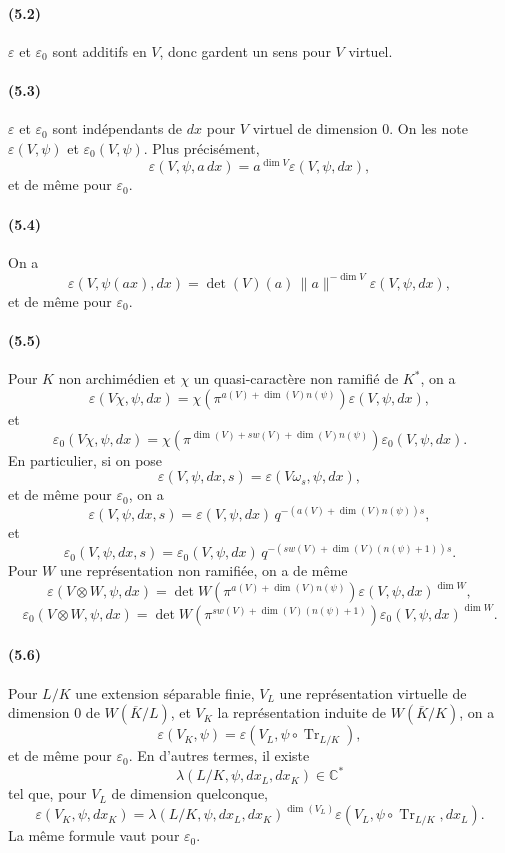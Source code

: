 \documentclass[10pt]{article}
\newcommand{\C}{\mathbb C}
\newcommand{\Tr}{\operatorname{Tr}}
\providecommand{\Tr}{\operatorname{Tr}}
\providecommand{\Tr}{\operatorname{Tr}}
\providecommand{\Tr}{\operatorname{Tr}}
\begin{document}
\paragraph{(5.2)} \(\varepsilon\) et \(\varepsilon_0\) sont additifs en \(V\), donc gardent un sens pour \(V\) virtuel.

\paragraph{(5.3)} \(\varepsilon\) et \(\varepsilon_0\) sont indépendants de \(dx\) pour \(V\) virtuel de dimension \(0\). On les note \(\varepsilon(V,\psi)\) et \(\varepsilon_0(V,\psi)\). Plus précisément,
\[
\varepsilon(V,\psi,a\,dx)=a^{\dim V}\varepsilon(V,\psi,dx),
\]
et de même pour \(\varepsilon_0\).

\paragraph{(5.4)} On a
\[
\varepsilon(V,\psi(ax),dx)
=
\det(V)(a)\,\|a\|^{-\dim V}\varepsilon(V,\psi,dx),
\]
et de même pour \(\varepsilon_0\).

\paragraph{(5.5)} Pour \(K\) non archimédien et \(\chi\) un quasi-caractère non ramifié de \(K^*\), on a
\[
\tag{5.5.1}
\varepsilon(V\chi,\psi,dx)
=
\chi\!\left(\pi^{a(V)+\dim(V)n(\psi)}\right)\varepsilon(V,\psi,dx),
\]
et
\[
\varepsilon_0(V\chi,\psi,dx)
=
\chi\!\left(\pi^{\dim(V)+sw(V)+\dim(V)n(\psi)}\right)
\varepsilon_0(V,\psi,dx).
\]
En particulier, si on pose
\[
\varepsilon(V,\psi,dx,s)=\varepsilon(V\omega_s,\psi,dx),
\]
et de même pour \(\varepsilon_0\), on a
\[
\tag{5.5.2}
\varepsilon(V,\psi,dx,s)
=
\varepsilon(V,\psi,dx)\,
q^{-(a(V)+\dim(V)n(\psi))s},
\]
et
\[
\varepsilon_0(V,\psi,dx,s)
=
\varepsilon_0(V,\psi,dx)\,
q^{-(sw(V)+\dim(V)(n(\psi)+1))s}.
\]
Pour \(W\) une représentation non ramifiée, on a de même
\[
\tag{5.5.3}
\varepsilon(V\otimes W,\psi,dx)
=
\det W\!\left(\pi^{a(V)+\dim(V)n(\psi)}\right)
\varepsilon(V,\psi,dx)^{\dim W},
\]
\[
\varepsilon_0(V\otimes W,\psi,dx)
=
\det W\!\left(\pi^{sw(V)+\dim(V)(n(\psi)+1)}\right)
\varepsilon_0(V,\psi,dx)^{\dim W}.
\]

\paragraph{(5.6)} Pour \(L/K\) une extension séparable finie, \(V_L\) une représentation virtuelle de dimension \(0\) de \(W(\overline K/L)\), et \(V_K\) la représentation induite de \(W(\overline K/K)\), on a
\[
\tag{5.6.1}
\varepsilon(V_K,\psi)=\varepsilon(V_L,\psi\circ\Tr_{L/K}),
\]
et de même pour \(\varepsilon_0\). En d'autres termes, il existe
\[
\lambda(L/K,\psi,dx_L,dx_K)\in\C^*
\]
tel que, pour \(V_L\) de dimension quelconque,
\[
\tag{5.6.2}
\varepsilon(V_K,\psi,dx_K)
=
\lambda(L/K,\psi,dx_L,dx_K)^{\dim(V_L)}
\varepsilon(V_L,\psi\circ\Tr_{L/K},dx_L).
\]
La même formule vaut pour \(\varepsilon_0\).
\end{document}
